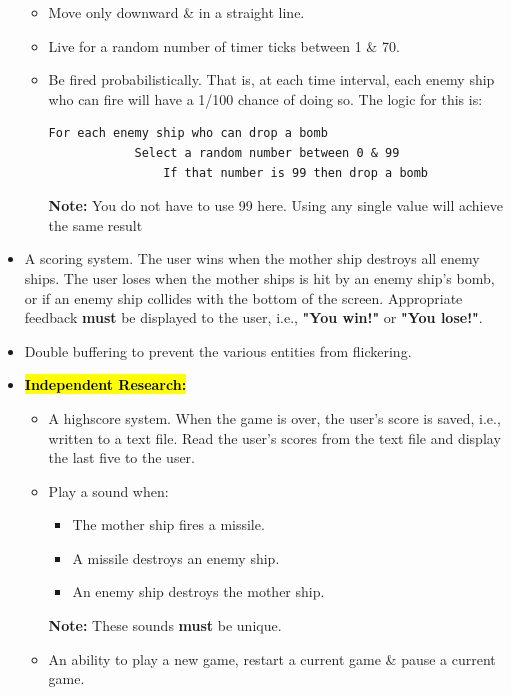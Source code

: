 \documentclass{article}
\begin{document}
\begin{itemize}
\begin{itemize}
        \item Move only downward \& in a straight line.
        \item Live for a random number of timer ticks between 1 \& 70.
        \item Be fired probabilistically. That is, at each time interval, each enemy ship who can fire will have a 1/100 chance of doing so. The logic for this is:
        \begin{Verbatim}[tabsize=2]
        For each enemy ship who can drop a bomb
            Select a random number between 0 & 99
                If that number is 99 then drop a bomb   
        \end{Verbatim}
        \textbf{Note:} You do not have to use 99 here. Using any single value will achieve the same result
    \end{itemize}
    \item A scoring system. The user wins when the mother ship destroys all enemy ships. The user loses when the mother ships is hit by an enemy ship's bomb, or if an enemy ship collides with the bottom of the screen. Appropriate feedback \textbf{must} be displayed to the user, i.e., \textbf{"You win!"} or \textbf{"You lose!"}.
    \item Double buffering to prevent the various entities from flickering.
    \item \hl{\textbf{Independent Research:}}
    \begin{itemize}
        \item A highscore system. When the game is over, the user's score is saved, i.e., written to a text file. Read the user's scores from the text file and display the last five to the user.
        \item Play a sound when:
        \begin{itemize}
            \item The mother ship fires a missile.
            \item A missile destroys an enemy ship.
            \item An enemy ship destroys the mother ship.
        \end{itemize}
        \textbf{Note:} These sounds \textbf{must} be unique.
        \item An ability to play a new game, restart a current game \& pause a current game.
    \end{itemize}
\end{itemize}
\end{document}
